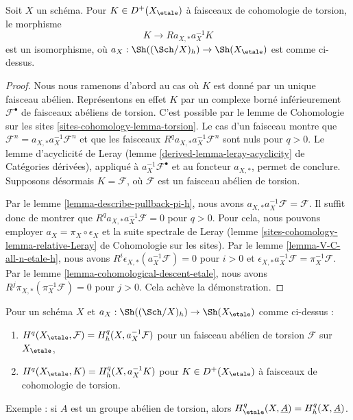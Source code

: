 \begin{lemma}
\label{lemma-cohomological-descent-etale-h}
Soit $X$ un schéma. Pour $K \in D^+(X_\etale)$ à faisceaux de cohomologie
de torsion, le morphisme
$$
K \longrightarrow Ra_{X, *}a_X^{-1}K
$$
est un isomorphisme, où $a_X : \Sh((\Sch/X)_h) \to \Sh(X_\etale)$ est comme ci-dessus.
\end{lemma}

\begin{proof}
Nous nous ramenons d'abord au cas où
$K$ est donné par un unique faisceau abélien. Représentons en effet $K$
par un complexe borné inférieurement $\mathcal{F}^\bullet$ de faisceaux
abéliens de torsion. C'est possible par le lemme de Cohomologie sur les sites
\ref{sites-cohomology-lemma-torsion}. Le cas d'un
faisceau montre que
$\mathcal{F}^n = a_{X, *} a_X^{-1} \mathcal{F}^n$
et que les faisceaux $R^qa_{X, *}a_X^{-1}\mathcal{F}^n$
sont nuls pour $q > 0$. Le lemme d'acyclicité de Leray
(lemme \ref{derived-lemma-leray-acyclicity} de Catégories dérivées),
appliqué à $a_X^{-1}\mathcal{F}^\bullet$
et au foncteur $a_{X, *}$, permet de conclure. Supposons désormais $K = \mathcal{F}$,
où $\mathcal{F}$ est un faisceau abélien de torsion.

\medskip\noindent
Par le lemme \ref{lemma-describe-pullback-pi-h}, nous avons
$a_{X, *}a_X^{-1}\mathcal{F} = \mathcal{F}$. Il suffit donc de montrer que
$R^qa_{X, *}a_X^{-1}\mathcal{F} = 0$ pour $q > 0$.
Pour cela, nous pouvons employer $a_X = \pi_X \circ \epsilon_X$ et
la suite spectrale de Leray
(lemme \ref{sites-cohomology-lemma-relative-Leray} de Cohomologie sur les sites).
Par le lemme \ref{lemma-V-C-all-n-etale-h},
nous avons $R^i\epsilon_{X, *}(a_X^{-1}\mathcal{F}) = 0$ pour $i > 0$
et $\epsilon_{X, *}a_X^{-1}\mathcal{F} = \pi_X^{-1}\mathcal{F}$.
Par le lemme \ref{lemma-cohomological-descent-etale}, nous avons
$R^j\pi_{X, *}(\pi_X^{-1}\mathcal{F}) = 0$ pour $j > 0$.
Cela achève la démonstration.
\end{proof}

\begin{lemma}
\label{lemma-compare-cohomology-etale-h}
Pour un schéma $X$ et $a_X : \Sh((\Sch/X)_h) \to \Sh(X_\etale)$
comme ci-dessus :
\begin{enumerate}
\item $H^q(X_\etale, \mathcal{F}) = H^q_h(X, a_X^{-1}\mathcal{F})$
pour un faisceau abélien de torsion $\mathcal{F}$ sur $X_\etale$,
\item $H^q(X_\etale, K) = H^q_h(X, a_X^{-1}K)$
pour $K \in D^+(X_\etale)$ à faisceaux de cohomologie de torsion.
\end{enumerate}
Exemple : si $A$ est un groupe abélien de torsion, alors
$H^q_\etale(X, \underline{A}) = H^q_h(X, \underline{A})$.
\end{lemma}

